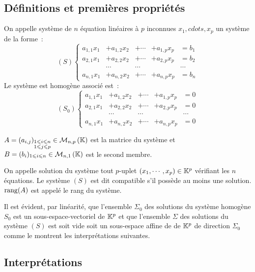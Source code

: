 \subsection{Définitions et premières propriétés}
On appelle système de $n$ équation linéaires à $p$ inconnues $x_1, cdots, x_p$ un système de la forme~:
\begin{equation}
	(S) \left\{ \begin{array}{lllll}
				a_{1,1}x_1 &+ a_{1,2}x_2 &+ \cdots &+ a_{1,p}x_p &= b_1 \\
				a_{2,1}x_1 &+ a_{2,2}x_2 &+ \cdots &+ a_{2,p}x_p &= b_2 \\
				           & \cdots      &  \cdots &             & \cdots \\
				a_{n,1}x_1 &+ a_{n,2}x_2 &+ \cdots &+ a_{n,p}x_p &= b_n
				\end{array}
		\right.
\end{equation}
Le système est homogène associé est~:
\begin{equation}
  (S_0) \left\{ \begin{array}{lllll}
		a_{1,1}x_1 &+ a_{1,2}x_2 &+ \cdots &+ a_{1,p}x_p &= 0 \\
		a_{2,1}x_1 &+ a_{2,2}x_2 &+ \cdots &+ a_{2,p}x_p &= 0 \\
		& \cdots      &  \cdots &             & \cdots \\
		a_{n,1}x_1 &+ a_{n,2}x_2 &+ \cdots &+ a_{n,p}x_p &= 0
	\end{array}
	\right.
\end{equation}

$A = (a_{i,j})_{\substack{1\leqslant i \leqslant n \\ 1 \leqslant j \leqslant p}} \in \mathcal{M}_{n,p}\left(\mathbb{K}\right)$ est la matrice du système et $B = (b_{i})_{1 \leqslant i \leqslant n} \in \mathcal{M}_{n,1}\left(\mathbb{K}\right)$ est le second membre.

On appelle solution du système tout $p$-uplet $(x_1,\cdots,x_p) \in \mathbb{K}^p$ vérifiant les $n$ équations. Le système $(S)$ est dit compatible s'il possède au moins une solution. $\operatorname{rang}(A)$ est appelé le rang du système.

Il est évident, par linéarité, que l'ensemble $\Sigma_0$ des solutions du système homogène $S_0$ est un sous-espace-vectoriel de $\mathbb{K}^p$ et que l'ensemble $\Sigma$ des solutions du système $(S)$ est soit vide soit un sous-espace affine de de $\mathbb{K}^p$ de direction $\Sigma_0$ comme le montrent les interprétations suivantes.

\subsection{Interprétations}


